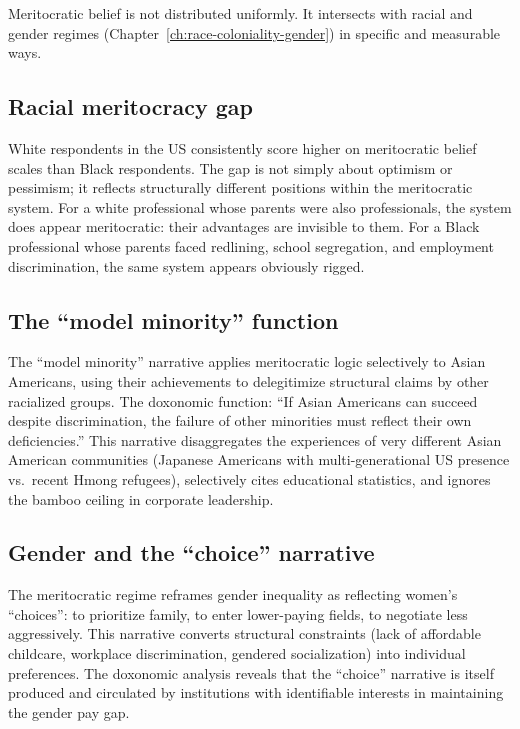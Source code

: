 Meritocratic belief is not distributed uniformly.
It intersects with racial and gender regimes (Chapter~\ref{ch:race-coloniality-gender}) in specific and measurable ways.

\subsection{Racial meritocracy gap}

White respondents in the US consistently score higher on meritocratic belief scales than Black respondents.
The gap is not simply about optimism or pessimism; it reflects structurally different positions within the meritocratic system.
For a white professional whose parents were also professionals, the system does appear meritocratic: their advantages are invisible to them.
For a Black professional whose parents faced redlining, school segregation, and employment discrimination, the same system appears obviously rigged.

\subsection{The ``model minority'' function}

The ``model minority'' narrative applies meritocratic logic selectively to Asian Americans, using their achievements to delegitimize structural claims by other racialized groups.
The doxonomic function: ``If Asian Americans can succeed despite discrimination, the failure of other minorities must reflect their own deficiencies.''
This narrative disaggregates the experiences of very different Asian American communities (Japanese Americans with multi-generational US presence vs.\ recent Hmong refugees), selectively cites educational statistics, and ignores the bamboo ceiling in corporate leadership.

\subsection{Gender and the ``choice'' narrative}

The meritocratic regime reframes gender inequality as reflecting women's ``choices'': to prioritize family, to enter lower-paying fields, to negotiate less aggressively.
This narrative converts structural constraints (lack of affordable childcare, workplace discrimination, gendered socialization) into individual preferences.
The doxonomic analysis reveals that the ``choice'' narrative is itself produced and circulated by institutions with identifiable interests in maintaining the gender pay gap.

